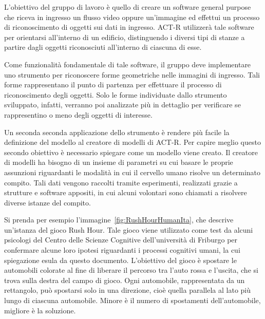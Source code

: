 		L'obiettivo del gruppo di lavoro è quello di creare un software general purpose che riceva in ingresso un flusso video oppure un'immagine ed effettui un processo di riconoscimento di oggetti sui dati in ingresso.
		\mbox{ACT-R} utilizzerà tale software per orientarsi all'interno di un edificio, distinguendo i diversi tipi di stanze a partire dagli oggetti riconosciuti all'interno di ciascuna di esse.

		Come funzionalità fondamentale di tale software, il gruppo deve implementare uno strumento per riconoscere forme geometriche nelle immagini di ingresso. 
		Tali forme rappresentano il punto di partenza per effettuare il processo di riconoscimento degli oggetti. 
		Solo le forme individuate dallo strumento sviluppato, infatti, verranno poi analizzate più in dettaglio per verificare se rappresentino o meno degli oggetti di interesse.

		Un seconda seconda applicazione dello strumento è rendere più facile la definizione del modello al creatore di modelli di \mbox{ACT-R}.
		Per capire meglio questo secondo obiettivo è necessario spiegare come un modello viene creato.
		Il creatore di modelli ha bisogno di un insieme di parametri su cui basare le proprie assunzioni riguardanti le modalità in cui il cervello umano risolve un determinato compito.
		Tali dati vengono raccolti tramite esperimenti, realizzati grazie a strutture e software appositi, in cui alcuni volontari sono chiamati a risolvere diverse istanze del compito.
		
		Si prenda per esempio l'immagine~\ref{fig:RushHourHumanIta}, che descrive un'istanza del gioco Rush Hour.
		Tale gioco viene utilizzato come test da alcuni psicologi del Centro delle Scienze Cognitive dell'università di Friburgo per confermare alcune loro ipotesi riguardanti i processi cognitivi umani, la cui spiegazione esula da questo documento.
		L'obiettivo del gioco è spostare le automobili colorate al fine di liberare il percorso tra l'auto rossa e l'uscita, che si trova sulla destra del campo di gioco.
		Ogni automobile, rappresentata da un rettangolo, può spostarsi solo in una direzione, cioè quella parallela al lato più lungo di ciascuna automobile.
		Minore è il numero di spostamenti dell'automobile, migliore è la soluzione. 	

